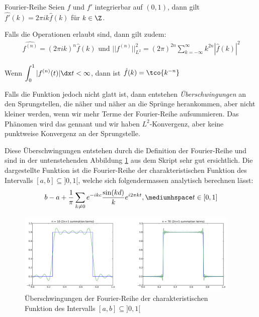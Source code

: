 \begin{theorem}[]{Fourier-Reihe}
    Seien $f$ und $f'$ integrierbar auf $(0, 1)$, dann gilt $\hat{f'}(k) = 2\pi ik\hat{f}(k)$ für $k \in \Z$.

    Falls die Operationen erlaubt sind, dann gilt zudem:
    \rmvspace
    \begin{align*}
        \hat{f^{(n)}} = (2\pi ik)^n \hat{f}(k) \text{ und } ||f^{(n)}||_{L^2}^2 = (2\pi)^{2n} \sum_{k = -\infty}^{\infty} k^{2n} |\hat{f}(k)|^2
    \end{align*}
\end{theorem}


\inlinetheorem Wenn $\displaystyle \int_{0}^{1} |f^{(n)}(t)|\dx t < \infty$, dann ist $\hat{f}(k) = \tco{k^{-n}}$

Falls die Funktion jedoch nicht glatt ist, dann entstehen \textit{Überschwingungen} an den Sprungstellen, die näher und näher an die Sprünge herankommen, aber nicht kleiner werden, wenn wir mehr Terme der Fourier-Reihe aufsummieren.
Das Phänomen wird das  gennant und wir haben $L^2$-Konvergenz, aber keine punktweise Konvergenz an der Sprungstelle.

\inlineremark
Diese Überschwingungen entstehen durch die Definition der Fourier-Reihe und sind in der untenstehenden Abbildung \ref{fig:trigo-interp-overarcing} aus dem Skript sehr gut ersichtlich.
Die dargestellte Funktion ist die Fourier-Reihe der charakteristischen Funktion des Intervalls $[a, b] \subseteq ]0, 1[$, welche sich folgendermassen analytisch berechnen lässt:
\begin{align*}
    b - a + \frac{1}{\pi} \sum_{k \neq 0} e^{-ikc}\frac{\sin(kd)}{k} e^{i2\pi kt}, \mediumhspace t \in [0, 1]
\end{align*}

\begin{figure}[h!]
    \begin{center}
        \includegraphics[width=0.95\textwidth]{assets/01_interpolation/01_trigonometric/overarcing.png}
    \end{center}
    \caption{Überschwingungen der Fourier-Reihe der charakteristischen Funktion des Intervalls $[a, b] \subseteq ]0, 1[$}
    \label{fig:trigo-interp-overarcing}
\end{figure}


